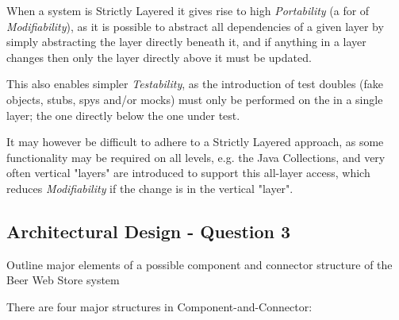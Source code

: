 When a system is Strictly Layered it gives rise to high \emph{Portability} (a for of \emph{Modifiability}), as it is possible to abstract all dependencies of a given layer by simply abstracting the layer directly beneath it, and if anything in a layer changes then only the layer directly above it must be updated.

This also enables simpler \emph{Testability}, as the introduction of test doubles (fake objects, stubs, spys and/or mocks) must only be performed on the in a single layer; the one directly below the one under test.

It may however be difficult to adhere to a Strictly Layered approach, as some functionality may be required on all levels, e.g. the Java Collections, and very often vertical "layers" are introduced to support this all-layer access, which reduces \emph{Modifiability} if the change is in the vertical "layer".

\subsection{Architectural Design - Question 3}

\begin{question}
Outline major elements of a possible component and connector
structure of the Beer Web Store system
\end{question}

There are four major structures in Component-and-Connector:


